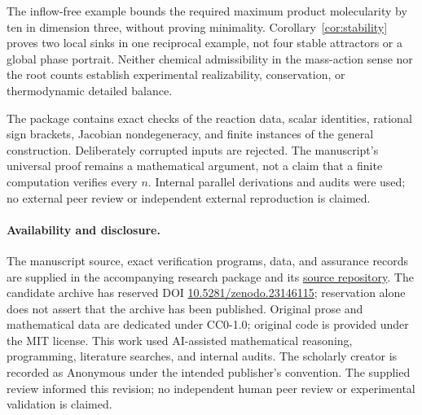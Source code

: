 \documentclass[11pt]{article}
\begin{document}
The inflow-free example bounds the required maximum product molecularity by ten in dimension three, without proving minimality. Corollary~\ref{cor:stability} proves two local sinks in one reciprocal example, not four stable attractors or a global phase portrait. Neither chemical admissibility in the mass-action sense nor the root counts establish experimental realizability, conservation, or thermodynamic detailed balance.

The package contains exact checks of the reaction data, scalar identities, rational sign brackets, Jacobian nondegeneracy, and finite instances of the general construction. Deliberately corrupted inputs are rejected. The manuscript's universal proof remains a mathematical argument, not a claim that a finite computation verifies every $n$. Internal parallel derivations and audits were used; no external peer review or independent external reproduction is claimed.

\paragraph{Availability and disclosure.}
The manuscript source, exact verification programs, data, and assurance records are supplied in the accompanying research package and its \href{https://github.com/ipitchford/quadratic-mass-action-sharpness}{source repository}. The candidate archive has reserved DOI \href{https://doi.org/10.5281/zenodo.23146115}{10.5281/zenodo.23146115}; reservation alone does not assert that the archive has been published. Original prose and mathematical data are dedicated under CC0-1.0; original code is provided under the MIT license. This work used AI-assisted mathematical reasoning, programming, literature searches, and internal audits. The scholarly creator is recorded as Anonymous under the intended publisher's convention. The supplied review informed this revision; no independent human peer review or experimental validation is claimed.
\end{document}
